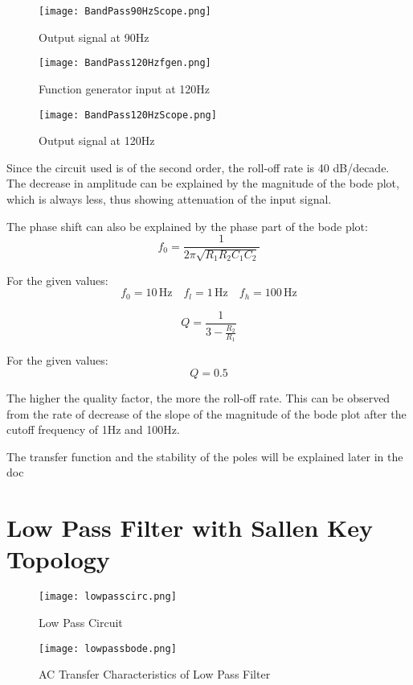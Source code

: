 \documentclass{article}
\begin{document}
\begin{figure}[ht]
  \centering
  \texttt{[image: BandPass90HzScope.png]}
  \caption{Output signal at 90Hz}
  \label{fig:output_90Hz}
\end{figure}

\newpage

\begin{figure}[ht]
  \centering
  \texttt{[image: BandPass120Hzfgen.png]}
  \caption{Function generator input at 120Hz}
  \label{fig:input_120Hz}
\end{figure}

\begin{figure}[ht]
  \centering
  \texttt{[image: BandPass120HzScope.png]}
  \caption{Output signal at 120Hz}
  \label{fig:output_120Hz}
\end{figure}

\newpage

Since the circuit used is of the second order, the roll-off rate is 40 dB/decade. The decrease in amplitude can be explained by the magnitude of the bode plot, which is always less, thus showing attenuation of the input signal.

The phase shift can also be explained by the phase part of the bode plot:
\[
f_0 = \frac{1}{2\pi \sqrt{R_1 R_2 C_1 C_2}}
\]

For the given values:
\[
f_0 = 10 \, \text{Hz}
\quad
f_l = 1 \, \text{Hz}
\quad
f_h = 100 \, \text{Hz}
\]

\[
Q = \frac{1}{3 - \frac{R_2}{R_1}}
\]

For the given values:
\[
Q = 0.5
\]

The higher the quality factor, the more the roll-off rate. This can be observed from the rate of decrease of the slope of the magnitude of the bode plot after the cutoff frequency of 1Hz and 100Hz.

The transfer function and the stability of the poles will be explained later in the doc
\newpage
\section{Low Pass Filter with Sallen Key Topology}
\begin{figure}[ht]
  \centering
  \texttt{[image: lowpasscirc.png]}
  \caption{Low Pass Circuit}
  \label{fig:output_120Hz}
\end{figure}

\begin{figure}[ht]
  \centering
  \texttt{[image: lowpassbode.png]}
  \caption{AC Transfer Characteristics of Low Pass Filter}
  \label{fig:output_120Hz}
\end{figure}
\newpage
\end{document}

